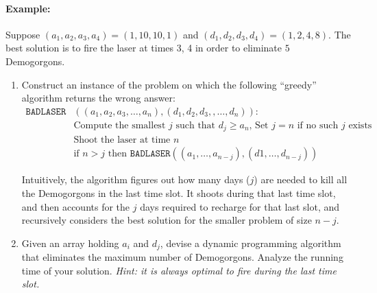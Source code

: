 \documentclass[10pt]{article}
\begin{document}
\paragraph{Example:} Suppose $(a_1, a_2, a_3, a_4) = (1, 10, 10, 1)$ and $(d_1, d_2, d_3, d_4) = (1,2,4,8)$. The best solution is to fire the laser at times 3, 4 in order to eliminate $5$ Demogorgons.

\begin{enumerate}
    \item Construct an instance of the problem on which the following ``greedy'' algorithm returns the wrong answer:
    \begin{align*}
        \mathtt{BADLASER}&((a_1, a_2, a_3, \ldots , a_n), (d_1, d_2, d_3, , \ldots, d_n)): \\
        & \text{Compute the smallest $j$ such that $d_j \geq  a_n$, Set $j = n$ if no such $j$ exists} \\
        & \text{Shoot the laser at time $n$}\\
        & \text{if $n > j$ then $\mathtt{BADLASER}((a_1, \ldots , a_{n - j}), (d1, \ldots , d_{n-j}))$}
    \end{align*}
    
    Intuitively, the algorithm figures out how many days ($j$) are needed to kill all the Demogorgons in the last time slot. It shoots during that last time slot, and then accounts for the $j$ days required to recharge for that last slot, and recursively considers the best solution for the smaller problem of size $n-j$.

    \soln

    
               
    \item Given an array holding $a_i$ and $d_j$, devise a dynamic programming algorithm that eliminates the maximum number of Demogorgons. Analyze the running time of your solution. \textit{Hint: it is always optimal to fire during the last time slot.}

    \soln



\end{enumerate}
\end{document}
